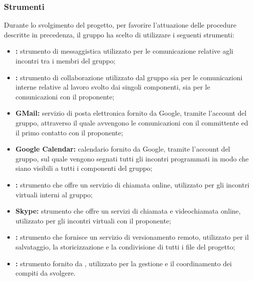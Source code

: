 \begin{itemize}
\begin{itemize}
			\end{itemize}
	
	\subsubsection{Strumenti}
	
		Durante lo svolgimento del progetto, per favorire l'attuazione delle procedure descritte in precedenza, il gruppo ha scelto di utilizzare i seguenti strumenti:
		\begin{itemize}
			\item \textbf{:} strumento di messaggistica utilizzato per le comunicazione relative agli incontri tra i membri del gruppo;
			\item \textbf{:} strumento di collaborazione utilizzato dal gruppo sia per le comunicazioni interne relative al lavoro svolto dai singoli componenti, sia per le comunicazioni con il proponente;
			\item \textbf{GMail:} servizio di posta elettronica fornito da Google, tramite l'account del gruppo, attraverso il quale avvengono le comunicazioni con il committente ed il primo contatto con il proponente;
			\item \textbf{Google Calendar:} calendario fornito da Google, tramite l'account del gruppo, sul quale vengono segnati tutti gli incontri programmati in modo che siano visibili a tutti i componenti del gruppo;
			\item \textbf{:} strumento che offre un servizio di chiamata online, utilizzato per gli incontri virtuali interni al gruppo;
			\item \textbf{Skype:} strumento che offre un servizi di chiamata e videochiamata online, utilizzato per gli incontri virtuali con il proponente;
			\item \textbf{:} strumento che fornisce un servizio di versionamento remoto, utilizzato per il salvataggio, la storicizzazione e la condivisione di tutti i file del progetto;
			\item \textbf{:} strumento fornito da , utilizzato per la gestione e il coordinamento dei compiti da svolgere.
		\end{itemize}
	